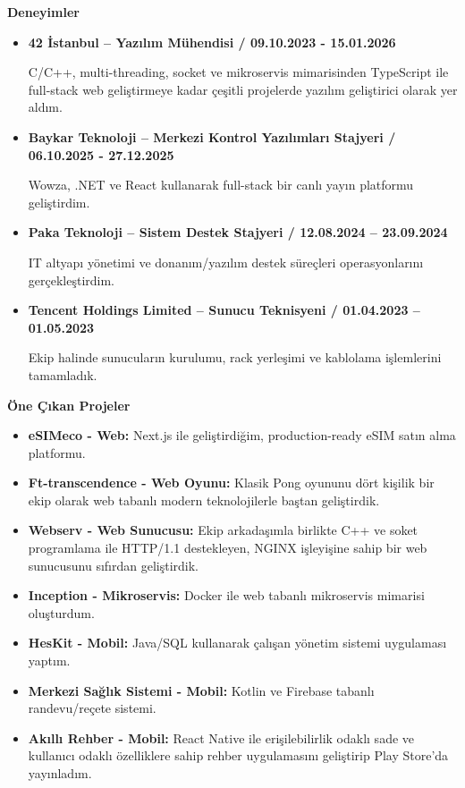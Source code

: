 \documentclass[a4paper,11pt]{article}
\begin{document}
\vspace{-0.4em}

\textbf{Deneyimler}
\vspace{-0.5em}
\begin{itemize}

  \item \textbf{42 İstanbul – Yazılım Mühendisi / 09.10.2023 - 15.01.2026}
    
    C/C++, multi-threading, socket ve mikroservis mimarisinden TypeScript ile full-stack web geliştirmeye kadar çeşitli projelerde yazılım geliştirici olarak yer aldım.
  \item \textbf{Baykar Teknoloji – Merkezi Kontrol Yazılımları Stajyeri / 06.10.2025 - 27.12.2025}
  
    Wowza, .NET ve React kullanarak full-stack bir canlı yayın platformu geliştirdim.
  
  \item \textbf{Paka Teknoloji – Sistem Destek Stajyeri / 12.08.2024 – 23.09.2024}
  
  IT altyapı yönetimi ve donanım/yazılım destek süreçleri operasyonlarını gerçekleştirdim.
  
  \item \textbf{Tencent Holdings Limited – Sunucu Teknisyeni / 01.04.2023 – 01.05.2023}
  
Ekip halinde sunucuların kurulumu, rack yerleşimi ve kablolama işlemlerini tamamladık.
\end{itemize}

\vspace{-0.4em}

\textbf{Öne Çıkan Projeler}
\vspace{-0.5em}
\begin{itemize}
    \item \textbf{eSIMeco - Web:} Next.js ile geliştirdiğim, production-ready eSIM satın alma platformu.
    \item \textbf{Ft-transcendence - Web Oyunu:} Klasik Pong oyununu dört kişilik bir ekip olarak web tabanlı modern teknolojilerle baştan geliştirdik.
    \item \textbf{Webserv - Web Sunucusu:} Ekip arkadaşımla birlikte C++ ve soket programlama ile HTTP/1.1 destekleyen, NGINX işleyişine sahip bir web sunucusunu sıfırdan geliştirdik.
  \item \textbf{Inception - Mikroservis:} Docker ile web tabanlı mikroservis mimarisi oluşturdum.
    \item \textbf{HesKit - Mobil:} Java/SQL kullanarak  çalışan yönetim sistemi uygulaması yaptım.
    \item \textbf{Merkezi Sağlık Sistemi - Mobil:} Kotlin ve Firebase tabanlı randevu/reçete sistemi.
  \item \textbf{Akıllı Rehber - Mobil:} React Native ile erişilebilirlik odaklı sade ve kullanıcı odaklı özelliklere sahip rehber uygulamasını geliştirip Play Store'da yayınladım.
\end{itemize}
\end{document}
